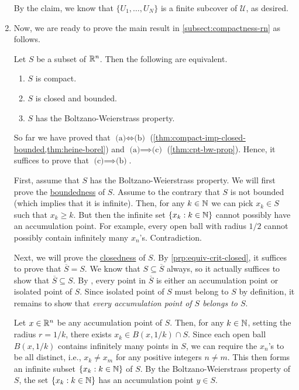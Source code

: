 \begin{enumerate}
\begin{pf}
By the claim, we know that \(\{U_1,\dotsc,U_N\}\) is a finite subcover of
\(\mathcal{U}\), as desired.
\end{pf}


\item Now, we are ready to prove the main result in
\cref{subsect:compactness-rn} as follows.

\begin{theorem}
\label{thm:cpt-equiv-criteria-rn}
Let \(S\) be a subset of \(\mathbb{R}^n\). Then the following are equivalent.
\begin{enumerate}
\item \(S\) is compact.
\item \(S\) is closed and bounded.
\item \(S\) has the Boltzano-Weierstrass property.
\end{enumerate}
\end{theorem}
\begin{pf}
So far we have proved that \(\text{(a)}\iff\text{(b)}\)
(\cref{thm:compact-imp-closed-bounded,thm:heine-borel}) and
\(\text{(a)}\implies \text{(c)}\) (\cref{thm:cpt-bw-prop}). Hence, it
suffices to prove that \(\text{(c)}\implies \text{(b)}\).

First, assume that \(S\) has the Boltzano-Weierstrass property. We will first
prove the \underline{boundedness} of \(S\). Assume to the contrary that \(S\)
is not bounded (which implies that it is infinite). Then, for any \(k\in\mathbb{N}\) we
can pick \(x_k\in S\) such that \(x_k\ge k\). But then the infinite set
\(\{x_k:k\in\mathbb{N}\}\) cannot possibly have an accumulation point. For example,
every open ball with radius \(1/2\) cannot possibly contain infinitely many
\(x_n\)'s. Contradiction.

Next, we will prove the \underline{closedness} of \(S\). By
\cref{prp:equiv-crit-closed}, it suffices to prove that \(\overline{S}=S\).  We
know that \(S\subseteq \overline{S}\) always, so it actually suffices to show
that \(\overline{S}\subseteq S\). By
, every point in \(\overline{S}\)
is either an accumulation point or isolated point of \(S\). Since isolated
point of \(S\) must belong to \(S\) by definition, it remains to show that
\emph{every accumulation point of \(S\) belongs to \(S\)}.

Let \(x\in\mathbb{R}^n\) be any accumulation point of \(S\). Then, for any \(k\in\mathbb{N}\),
setting the radius \(r=1/k\), there exists \(x_k\in B(x,1/k)\cap S\). Since each open
ball \(B(x,1/k)\) contains infinitely many points in \(S\), we can require the
\(x_n\)'s to be all distinct, i.e., \(x_k\ne x_m\) for any positive integers
\(n\ne m\). This then forms an infinite subset \(\{x_k:k\in\mathbb{N}\}\) of \(S\). By
the Boltzano-Weierstrass property of \(S\), the set \(\{x_k:k\in\mathbb{N}\}\) has an
accumulation point \(y\in S\).


\end{pf}
\end{enumerate}
